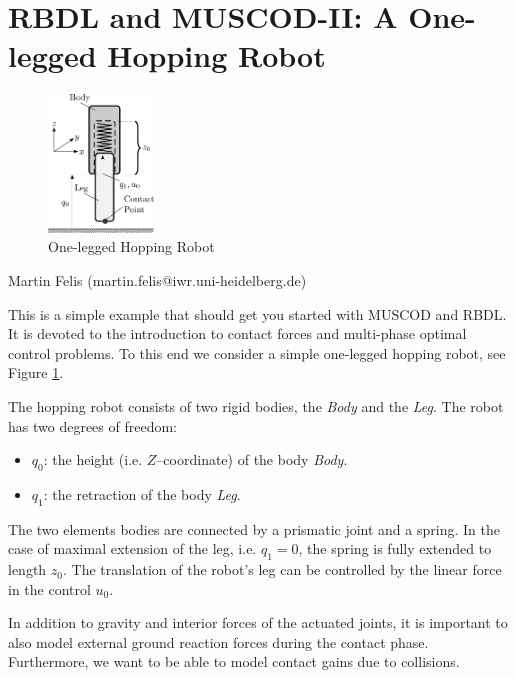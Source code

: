 \documentclass[a4paper,english,12pt]{report}
\newcommand{\rbdl}[0]{\textsc{RBDL}}
\newcommand{\muscod}[0]{\textsc{MUSCOD-II}}
\begin{document}
\thispagestyle{empty}


\section*{\rbdl{} and \muscod{}: A One-legged Hopping Robot} 

\begin{figure}
	\begin{center}
		\includegraphics[width=0.25\textwidth]{./hoppingrobot}
	\end{center}
	\caption{One-legged Hopping Robot}
	\label{fig:hoppingrobot}
\end{figure}

Martin Felis (martin.felis@iwr.uni-heidelberg.de)

\bigskip
\bigskip

This is a simple example that should get you started with MUSCOD and RBDL. It is devoted to the introduction to contact forces and multi-phase optimal control problems. To this end we consider a simple one-legged hopping robot, see Figure \ref{fig:hoppingrobot}.

The hopping robot consists of two rigid bodies, the \emph{Body} and the
\emph{Leg}. The robot has two degrees of freedom:
\begin{itemize}
 \item $q_0$: the height (i.e. $Z$--coordinate) of the body \emph{Body}.
 \item $q_1$: the retraction of the body \emph{Leg}.
\end{itemize}
The two elements bodies are connected by a prismatic joint and a spring.
In the case of maximal extension of the leg, i.e. $q_1 = 0$, the spring
is fully extended to length $z_0$. The translation of the robot's leg can
be controlled by the linear force in the control $u_0$. 

In addition to gravity and interior forces of the actuated joints, it is
important to also model external ground reaction forces during the contact
phase. Furthermore, we want to be able to model contact gains due to
collisions. 
\end{document}
